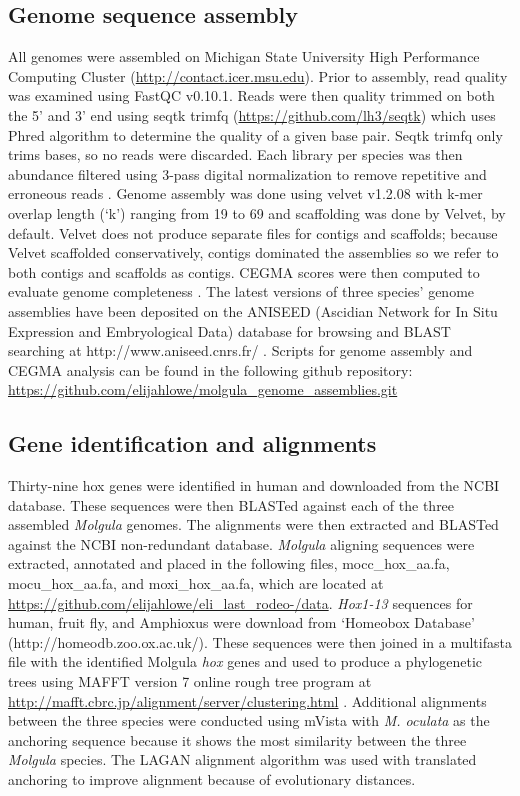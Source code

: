 \subsection{Genome sequence assembly}
All genomes were assembled on Michigan State University High Performance Computing Cluster (\url{http://contact.icer.msu.edu}). Prior to assembly, read quality was examined using FastQC v0.10.1. Reads were then quality trimmed on both the 5' and 3' end using seqtk trimfq (\url{https://github.com/lh3/seqtk}) which uses Phred algorithm to determine the quality of a given base pair. Seqtk trimfq only trims bases, so no reads were discarded. Each library per species was then abundance filtered using 3-pass digital normalization to remove repetitive and erroneous reads \cite{brown_reference-free_2012,schwarz_genome_2013,howe_tackling_2014}. Genome assembly was done using velvet v1.2.08 \cite{zerbino_velvet:_2008} with k-mer overlap length (`k') ranging from 19 to 69 and scaffolding was done by Velvet, by default. Velvet does not produce separate files for contigs and scaffolds; because Velvet scaffolded conservatively, contigs dominated the assemblies so we refer to both contigs and scaffolds as contigs. CEGMA scores were then computed to evaluate genome completeness \cite{parra_cegma:_2007}. The latest versions of three species' genome assemblies have been deposited on the ANISEED (Ascidian Network for In Situ Expression and Embryological Data) database for browsing and BLAST searching at http://www.aniseed.cnrs.fr/ \cite{tassy_aniseed_2010}. Scripts for genome assembly and CEGMA analysis can be found in the following github repository: \url{https://github.com/elijahlowe/molgula_genome_assemblies.git}
\subsection{Gene identification and alignments}
Thirty-nine hox genes were identified in human and downloaded from the NCBI database. These sequences were then BLASTed against each of the three assembled \textit{Molgula} genomes. The alignments were then extracted and BLASTed against the NCBI non-redundant database. \textit{Molgula} aligning sequences were extracted, annotated and placed in the following files, mocc\_hox\_aa.fa, mocu\_hox\_aa.fa, and moxi\_hox\_aa.fa, which are located at \url{https://github.com/elijahlowe/eli_last_rodeo-/data}. \textit{Hox1-13} sequences for human, fruit fly, and Amphioxus were download from `Homeobox Database' (http://homeodb.zoo.ox.ac.uk/). These sequences were then joined in a multifasta file with the identified Molgula \textit{hox} genes and used to produce a phylogenetic trees using MAFFT version 7 online rough tree program at \url{http://mafft.cbrc.jp/alignment/server/clustering.html} \cite{katoh_parttree:_2007,katoh_mafft_2013}.  Additional alignments between the three species were conducted using mVista \cite{mayor_vista_2000,frazer_vista:_2004,visel_vista_2007} with \textit{M. oculata} as the anchoring sequence because it shows the most similarity between the three \textit{Molgula} species. The LAGAN alignment algorithm was used with translated anchoring to improve alignment because of evolutionary distances\cite{brudno_lagan_2003}.    

